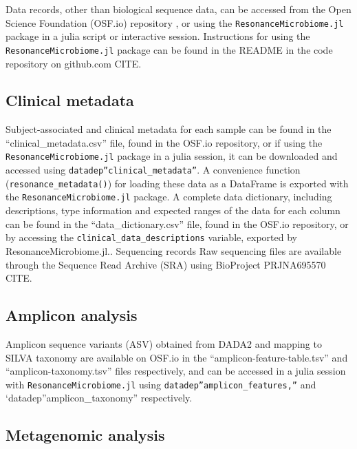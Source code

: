 \documentclass[fleqn,10pt]{wlscirep}
\begin{document}

Data records, other than biological sequence data, can be accessed from the Open Science Foundation (OSF.io) repository \cite{Bonham2021-zy},
or using the \verb|ResonanceMicrobiome.jl| package in a julia script or interactive session.
Instructions for using the \verb|ResonanceMicrobiome.jl| package can be found in the README in the code repository on github.com {{CITE}}.

\subsection*{Clinical metadata}

Subject-associated and clinical metadata for each sample can be found in the “clinical_metadata.csv” file,
found in the OSF.io repository, or if using the \verb|ResonanceMicrobiome.jl| package in a julia session,
it can be downloaded and accessed using \verb|datadep”clinical_metadata”|. A convenience function (\verb|resonance_metadata()|) for loading these data as a DataFrame is exported with the \verb|ResonanceMicrobiome.jl| package.
A complete data dictionary, including descriptions, type information and expected ranges of the data for each column can be found in the “data_dictionary.csv” file, found in the OSF.io repository, or by accessing the \verb|clinical_data_descriptions| variable, exported by ResonanceMicrobiome.jl..
Sequencing records
Raw sequencing files are available through the Sequence Read Archive (SRA) using BioProject PRJNA695570 {{CITE}}.

\subsection*{Amplicon analysis}

Amplicon sequence variants (ASV) obtained from DADA2 and mapping to SILVA taxonomy are available on OSF.io
in the “amplicon-feature-table.tsv” and “amplicon-taxonomy.tsv” files respectively,
and can be accessed in a julia session with \verb|ResonanceMicrobiome.jl| using \verb|datadep”amplicon_features,”|
and `datadep”amplicon_taxonomy” respectively.

\subsection*{Metagenomic analysis}
\end{document}
